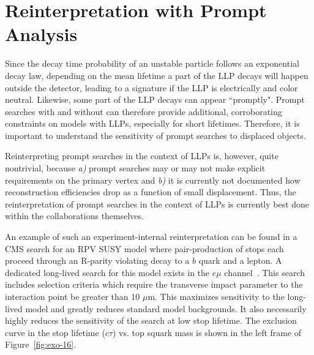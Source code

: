 
\section{Reinterpretation with Prompt Analysis}\label{sec:ch5-recastingPrompt}



Since the decay time probability of an unstable particle follows an
exponential decay law, depending on the mean lifetime a part of the LLP
decays will happen outside the detector, leading to a \MET signature if the LLP is
electrically and color neutral. Likewise, some part of the LLP decays
can appear ``promptly". Prompt searches with and without \MET can
therefore provide additional, corroborating constraints on models with
LLPs, especially for short lifetimes. Therefore, it is important to
understand the sensitivity of prompt searches to displaced objects.

Reinterpreting prompt searches in the context of LLPs is, however,
quite nontrivial, because {\it a)} prompt searches may or may not make
explicit requirements on the primary vertex and {\it b)} it is
currently not documented how reconstruction efficiencies drop as a
function of small displacement. Thus, the reinterpretation of prompt
searches in the context of LLPs is currently best done within the
collaborations themselves.


An example of such an experiment-internal reinterpretation can be found in a CMS
search for an RPV SUSY model where pair-production of stops each proceed through
an R-parity violating decay to a $b$ quark and a lepton. A dedicated long-lived
search for this model exists in the $e\mu$ channel~\cite{CMS-PAS-EXO-16-022}.
This search includes selection criteria which require the transverse impact
parameter to the interaction point be greater than 10 $\mu$m. This maximizes
sensitivity to the long-lived model and greatly reduces standard model
backgrounds. It also necessarily highly reduces the sensitivity of the search at
low stop lifetime. The exclusion curve in the stop lifetime ($c\tau$) vs. top
squark mass is shown in the left frame of Figure~\ref{fig:exo-16}.

